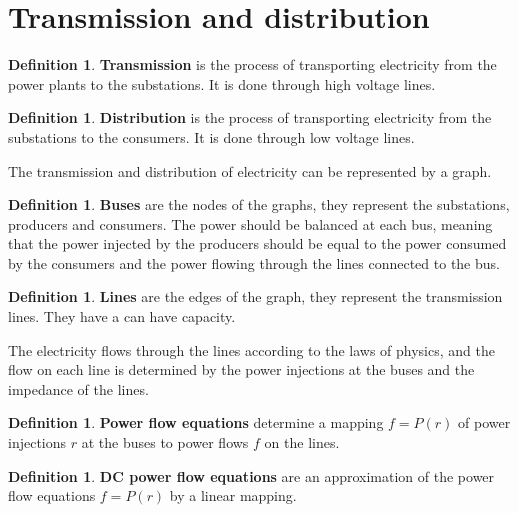 \documentclass[12pt, openany]{report}
\theoremstyle{definition}
\newtheorem{definition}[thm]{Definition}
\begin{document}
\section{Transmission and distribution}
\begin{definition}
    \textbf{Transmission} is the process of transporting electricity from the power plants to the substations. It is done through high voltage lines.
\end{definition}
\begin{definition}
    \textbf{Distribution} is the process of transporting electricity from the substations to the consumers. It is done through low voltage lines.
\end{definition}
The transmission and distribution of electricity can be represented by a graph.
\begin{definition}
    \textbf{Buses} are the nodes of the graphs, they represent the substations, producers and consumers. The power should be balanced at each bus, meaning that the power injected by the producers should be equal to the power consumed by the consumers and the power flowing through the lines connected to the bus.
\end{definition}
\begin{definition}
    \textbf{Lines} are the edges of the graph, they represent the transmission lines. They have a can have capacity. 
\end{definition}
The electricity flows through the lines according to the laws of physics, and the flow on each line is determined by the power injections at the buses and the impedance of the lines.
\begin{definition}
    \textbf{Power flow equations} determine a mapping $f = P(r)$ of power injections $r$ at the buses to power flows $f$ on the lines.
\end{definition}
\begin{definition}
    \textbf{DC power flow equations} are an approximation of the power flow equations $f = P(r)$ by a linear mapping. 
\end{definition}
\end{document}
